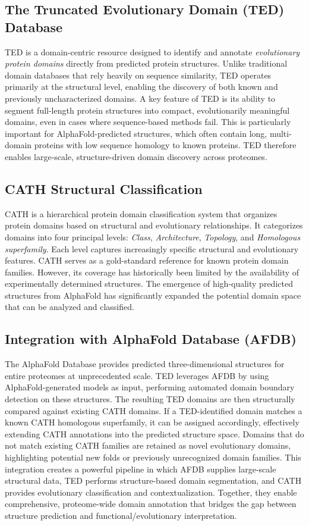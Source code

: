 \documentclass[11pt]{article}
\begin{document}
\subsection{The Truncated Evolutionary Domain (TED) Database}
TED is a domain-centric resource designed to identify and annotate \emph{evolutionary protein domains} directly from predicted protein structures. Unlike traditional domain databases that rely heavily on sequence similarity, TED operates primarily at the structural level, enabling the discovery of both known and previously uncharacterized domains.
A key feature of TED is its ability to segment full-length protein structures into compact, evolutionarily meaningful domains, even in cases where sequence-based methods fail. This is particularly important for AlphaFold-predicted structures, which often contain long, multi-domain proteins with low sequence homology to known proteins. TED therefore enables large-scale, structure-driven domain discovery across proteomes.
\subsection{CATH Structural Classification}
CATH is a hierarchical protein domain classification system that organizes protein domains based on structural and evolutionary relationships. It categorizes domains into four principal levels: \emph{Class}, \emph{Architecture}, \emph{Topology}, and \emph{Homologous superfamily}. Each level captures increasingly specific structural and evolutionary features.
CATH serves as a gold-standard reference for known protein domain families. However, its coverage has historically been limited by the availability of experimentally determined structures. The emergence of high-quality predicted structures from AlphaFold has significantly expanded the potential domain space that can be analyzed and classified.

\subsection{Integration with AlphaFold Database (AFDB)}
The AlphaFold Database provides predicted three-dimensional structures for entire proteomes at unprecedented scale. TED leverages AFDB by using AlphaFold-generated models as input, performing automated domain boundary detection on these structures. The resulting TED domains are then structurally compared against existing CATH domains.
If a TED-identified domain matches a known CATH homologous superfamily, it can be assigned accordingly, effectively extending CATH annotations into the predicted structure space. Domains that do not match existing CATH families are retained as novel evolutionary domains, highlighting potential new folds or previously unrecognized domain families.
This integration creates a powerful pipeline in which AFDB supplies large-scale structural data, TED performs structure-based domain segmentation, and CATH provides evolutionary classification and contextualization. Together, they enable comprehensive, proteome-wide domain annotation that bridges the gap between structure prediction and functional/evolutionary interpretation.
\end{document}
